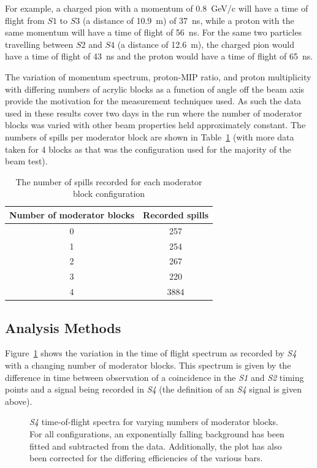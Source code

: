 For example, a charged pion with a momentum of 0.8~GeV/c will have a time of flight from $\mathit{S1}$ to $\mathit{S3}$ (a distance of 10.9~m) of 37~ns, while a proton with the same momentum will have a time of flight of 56~ns.
For the same two particles travelling between $\mathit{S2}$ and $\mathit{S4}$ (a distance of 12.6~m), the charged pion would have a time of flight of 43~ns and the proton would have a time of flight of 65~ns.

The variation of momentum spectrum, proton-MIP ratio, and proton multiplicity with differing numbers of acrylic blocks as a function of angle off the beam axis provide the motivation for the measurement techniques used.
As such the data used in these results cover two days in the run where the number of moderator blocks was varied with other beam properties held approximately constant.
The numbers of spills per moderator block are shown in Table~\ref{tab:spills} (with more data taken for 4 blocks as that was the configuration used for the majority of the beam test).

\begin{table}
	\centering
	\begin{tabular}{|c|c|}
		\hline
		Number of moderator blocks & Recorded spills \\
		\hline
		0 & 257 \\
		1 & 254 \\
		2 & 267 \\
		3 & 220 \\
		4 & 3884 \\
		\hline
	\end{tabular}
	\caption{The number of spills recorded for each moderator block configuration}
	\label{tab:spills}
\end{table}

\subsection{Analysis Methods}

Figure~\ref{fig:s4tof} shows the variation in the time of flight spectrum as recorded by \textit{S4} with a changing number of moderator blocks.
This spectrum is given by the difference in time between observation of a coincidence in the \textit{S1} and \textit{S2} timing points and a signal being recorded in \textit{S4} (the definition of an \textit{S4} signal is given above).

\begin{figure}[h]
  \begin{adjustbox}{max totalsize={.8\textwidth}{.5\textheight},center}
    
  \end{adjustbox}
  \caption{\textit{S4} time-of-flight spectra for varying numbers of moderator blocks. For all configurations, an exponentially falling background has been fitted and subtracted from the data. Additionally, the plot has also been corrected for the differing efficiencies of the various bars.}
  \label{fig:s4tof}	
\end{figure}

